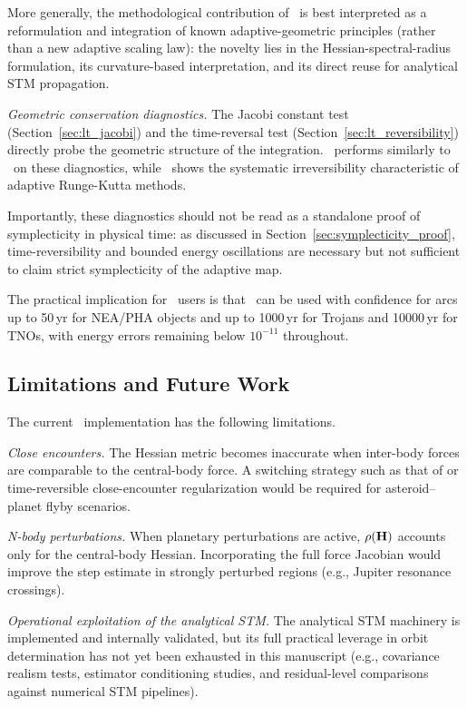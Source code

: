More generally, the methodological contribution of \AAS\ is
best interpreted as a reformulation and integration of known
adaptive-geometric principles (rather than a new adaptive
scaling law): the novelty lies in the Hessian-spectral-radius
formulation, its curvature-based interpretation, and its direct
reuse for analytical STM propagation.

\textit{Geometric conservation diagnostics.} The Jacobi constant
test (Section~\ref{sec:lt_jacobi}) and the time-reversal
test (Section~\ref{sec:lt_reversibility}) directly probe
the geometric structure of the integration. \saba\ performs
similarly to \AAS\ on these diagnostics, while \rkf\ shows the systematic
irreversibility characteristic of adaptive Runge-Kutta
methods.

Importantly, these diagnostics should not be read as a standalone
proof of symplecticity in physical time: as discussed in
Section~\ref{sec:symplecticity_proof}, time-reversibility and bounded
energy oscillations are necessary but not sufficient to claim
strict symplecticity of the adaptive map.

The practical implication for \astdyn\ users is that
\AAS\ can be used with confidence for arcs up to
50\,yr for NEA/PHA objects and up to
1000\,yr for Trojans and 10000\,yr for TNOs, with energy errors
remaining below $10^{-11}$ throughout.

\subsection{Limitations and Future Work}
\label{sec:limitations}

The current \AAS\ implementation has the following limitations.

\textit{Close encounters.} The Hessian metric becomes inaccurate
when inter-body forces are comparable to the central-body force.
A switching strategy such as that of \citet{HernandezDehnen2024}
or time-reversible close-encounter regularization \citep{Lu2024trace}
would be required for asteroid--planet flyby scenarios.

\textit{N-body perturbations.} When planetary perturbations are
active, $\rho(\mathbf{H})$ accounts only for the central-body Hessian.
Incorporating the full force Jacobian would improve the step estimate
in strongly perturbed regions (e.g., Jupiter resonance crossings).

\textit{Operational exploitation of the analytical STM.} The analytical
STM machinery is implemented and internally validated, but its full
practical leverage in orbit determination has not yet been exhausted
in this manuscript (e.g., covariance realism tests, estimator
conditioning studies, and residual-level comparisons against numerical
STM pipelines).

